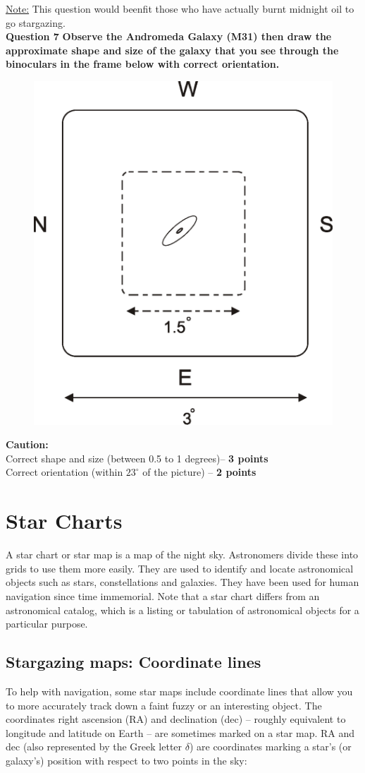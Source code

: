 \documentclass[a4paper,12pt]{extarticle}
\begin{document}
\underline{Note:} This question would beenfit those who have actually burnt midnight oil to go stargazing.\\

\textsf{\textbf{Question 7}} \textbf{Observe the Andromeda Galaxy (M31) then draw the approximate shape and size of the galaxy that you see through the binoculars in the frame below with correct orientation.}
\begin{figure}[H]
	\centering
	\includegraphics[width=0.4\linewidth]{andromedasize.eps}
\end{figure}
\textbf{Caution:}\\
{\color{red} Correct shape and size (between 0.5 to 1 degrees)-- \textbf{3 points}\\
Correct orientation (within $23^\circ$ of the picture) -- \textbf{ 2 points}}


\clearpage



\section{Star Charts}

A star chart or star map is a map of the night sky. Astronomers divide these into grids to use them more easily. They are used to identify and locate astronomical objects such as stars, constellations and galaxies. They have been used for human navigation since time immemorial. Note that a star chart differs from an astronomical catalog, which is a listing or tabulation of astronomical objects for a particular purpose. 

\subsection{Stargazing maps: Coordinate lines}

To help with navigation, some star maps include coordinate lines that allow you to more accurately track down a faint fuzzy or an interesting object. The coordinates right ascension (RA) and declination (dec) – roughly equivalent to longitude and latitude on Earth – are sometimes marked on a star map. RA and dec (also represented by the Greek letter $\delta$) are coordinates marking a star’s (or galaxy’s) position with respect to two points in the sky:
\end{document}
